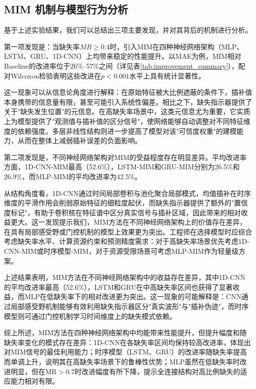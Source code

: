 \documentclass[10pt,a4paper]{ctexart}
\begin{document}
\subsection{MIM 机制与模型行为分析}

基于上述实验结果，我们可以总结出三项主要发现，并对其背后的机制进行分析。

第一项发现是：当缺失率$MR \ge 0.4$时，引入MIM在四种神经网络架构（MLP、LSTM、GRU、1D-CNN）上均带来稳定的性能提升。以MAE为例，MIM相对Baseline的改进率位于26\%--57\%之间（详见表\ref{tab:improvement_summary}），配对Wilcoxon检验表明这些改进在$p<0.001$水平上具有统计显著性。

这一现象可以从信息论角度进行解释：在原始特征被大比例遮蔽的条件下，插补值本身携带的信息量有限，甚至可能引入系统性偏差。相比之下，缺失指示器提供了关于"缺失发生位置"的元信息。在高缺失率场景中，这类元信息尤为重要，它实质上为模型提供了"观测值与插补值的区分信号"，使网络能够自动调整对不同特征维度的依赖强度。多层非线性结构则进一步提高了模型对该"可信度权重"的建模能力，从而在整体上减弱插补误差的负面影响。

第二项发现是，不同神经网络架构对MIM的受益程度存在明显差异。平均改进率方面，1D-CNN-MIM最高（52.6\%），LSTM-MIM和GRU-MIM分别为26.5\%和26.9\%，而MLP-MIM的平均改进率为42.5\%。

从结构角度看，1D-CNN通过时间局部卷积与池化聚合局部模式，均值插补在时序维度的平滑作用会削弱原始特征的细粒度起伏，而缺失指示器提供了额外的"置信度标记"，有助于卷积核在特征谱中区分真实信号与插补区域，因此带来的相对收益更大。这一发现提示我们，MIM方法在不同神经网络架构上的价值存在差异，在具有局部感受野或门控机制的模型上效果更为突出。工程师在选择模型时应综合考虑缺失率水平、计算资源约束和预测精度需求：对于高缺失率场景优先考虑1D-CNN-MIM或时序模型-MIM，对于资源受限场景可考虑MLP-MIM作为轻量级方案。

上述结果表明，MIM方法在不同神经网络架构中的收益存在差异，其中1D-CNN的平均改进率最高（52.6\%），LSTM和GRU在中高缺失率区间也获得了显著收益，而MLP在低缺失率下的相对改进更为突出。这一现象的可能解释是：CNN通过局部感受野机制能够有效利用缺失指示器区分"真实波形"与"插补伪迹"，而时序模型则可通过门控机制学习时间维度上的缺失模式依赖。

综上所述，MIM方法在四种神经网络架构中均能带来性能提升，但提升幅度和随缺失率变化的模式存在差异：1D-CNN在各缺失率区间均保持较高改进率，体现出对MIM信号的最佳利用能力；时序模型（LSTM、GRU）的改进率随缺失率提高而单调上升，说明其在高缺失率场景下的鲁棒性优势；MLP虽然在低缺失率时改进明显，但在MR$>$0.7时改进幅度有所下降，提示全连接结构对高比例缺失的适应能力相对有限。
\end{document}
